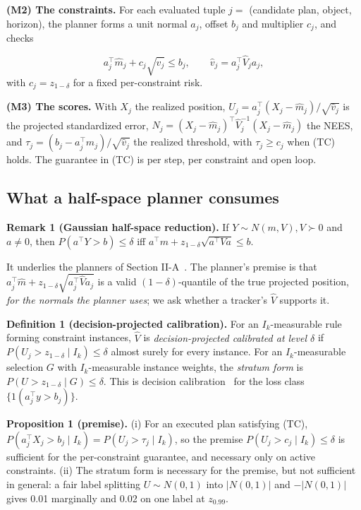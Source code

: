 \documentclass{ieeeaccess}
\begin{document}
\textbf{(M2) The constraints.} For each evaluated tuple $j =$ (candidate plan, object, horizon), the planner forms a unit normal $a_{j}$, offset $b_{j}$ and multiplier $c_{j}$, and checks

\begin{equation*}
a_j^{\top}\hat{m}_j + c_j\sqrt{\hat{v}_j} \leq b_j, \qquad \hat{v}_j = a_j^{\top}\hat{V}_j a_j,\tag{TC}
\end{equation*}
with $c_{j} = z_{1-\delta}$ for a fixed per-constraint risk.

\textbf{(M3) The scores.} With $X_{j}$ the realized position, $U_{j} = a_{j}^{\top}(X_{j} - \hat{m}_{j})/\sqrt{\hat{v}_{j}}$ is the projected standardized error, $N_{j} = (X_{j} - \hat{m}_{j})^{\top}\hat{V}_{j}^{-1}(X_{j} - \hat{m}_{j})$ the NEES, and $\tau_{j} = (b_{j} - a_{j}^{\top}\hat{m}_{j})/\sqrt{\hat{v}_{j}}$ the realized threshold, with $\tau_{j} \geq c_{j}$ when (TC) holds. The guarantee in (TC) is per step, per constraint and open loop.

\subsection{What a half-space planner consumes}
\textbf{Remark 1 (Gaussian half-space reduction).} If $Y \sim N(m, V), V \succ 0$ and $a \neq 0$, then $P(a^{\top}Y > b) \leq \delta$ iff $a^{\top}m + z_{1-\delta}\sqrt{a^{\top}Va} \leq b$.

It underlies the planners of Section II-A~\cite{Blackmore2011,Ono2008,Zhu2019,Nair2025,Ren2025}. The planner's premise is that $a_{j}^{\top}\hat{m} + z_{1-\delta}\sqrt{a_{j}^{\top}\hat{V}a_{j}}$ is a valid $(1 - \delta)$-quantile of the true projected position, \emph{for the normals the planner uses}; we ask whether a tracker's $\hat{V}$ supports it.

\textbf{Definition 1 (decision-projected calibration).} For an $I_{k}$-measurable rule forming constraint instances, $\hat{V}$ is \emph{decision-projected calibrated at level $\delta$} if $P(U_{j} > z_{1-\delta} \mid I_{k}) \leq \delta$ almost surely for every instance. For an $I_{k}$-measurable selection $G$ with $I_{k}$-measurable instance weights, the \emph{stratum form} is $P(U > z_{1-\delta} \mid G) \leq \delta$. This is decision calibration~\cite{Zhao2021} for the loss class $\{1(a_{j}^{\top}y > b_{j})\}$.

\textbf{Proposition 1 (premise).} (i) For an executed plan satisfying (TC), $P(a_{j}^{\top}X_{j} > b_{j} \mid I_{k}) = P(U_{j} > \tau_{j} \mid I_{k})$, so the premise $P(U_{j} > c_{j} \mid I_{k}) \leq \delta$ is sufficient for the per-constraint guarantee, and necessary only on active constraints. (ii) The stratum form is necessary for the premise, but not sufficient in general: a fair label splitting $U \sim N(0, 1)$ into $|N(0, 1)|$ and $-|N(0, 1)|$ gives 0.01 marginally and 0.02 on one label at $z_{0.99}$.
\end{document}
